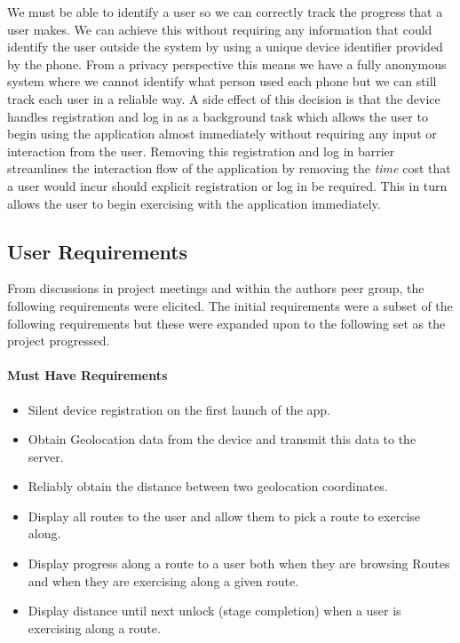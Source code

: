 We must be able to identify a user so we can correctly track the
progress that a user makes. We can achieve this without requiring any
information that could identify the user outside the system by using a
unique device identifier provided by the phone. From a privacy 
perspective this means we have a fully anonymous system where we
cannot identify what person used each phone but we can still track
each user in a reliable way. A side effect of this decision is that
the device handles registration and log in as a background task which
allows the user to begin using the application almost immediately
without requiring any input or interaction from the user. Removing
this registration and log in barrier streamlines the interaction flow
of the application by removing the \emph{time} cost that a user would
incur should explicit registration or log in be required. This in turn
allows the user to begin exercising with the application immediately.


\subsection{User Requirements}
From discussions in project meetings and within the authors peer
group, the following requirements were elicited. The initial
requirements were a subset of the following requirements but these
were expanded upon to the following set as the project progressed.
\paragraph{Must Have Requirements}
\begin{itemize}
\item Silent device registration on the first launch of the app.
\item Obtain Geolocation data from the device and transmit this data
  to the server.
\item Reliably obtain the distance between two geolocation
  coordinates. 
\item Display all routes to the user and allow them to pick a route to
  exercise along.
\item Display progress along a route to a user both when they are
  browsing Routes and when they are exercising along a given route.
\item Display distance until next unlock (stage completion) when a
  user is exercising along a route.
\end{itemize} 


